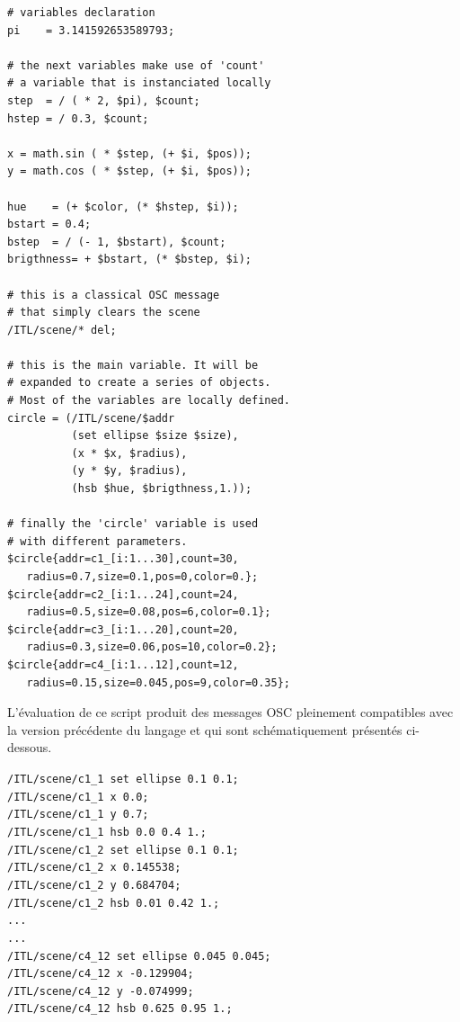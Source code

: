 \documentclass{article}
\newcommand{\code}	[2][0.9]		{\vspace{0mm}\begin{center}\colorbox{mygrey}{
							\begin{minipage}[t]{#1\columnwidth} 
							{\small \texttt{#2}}
							\end{minipage}}\end{center}}
\begin{document}
\begin{lstlisting}[language=inscore, extendedchars=true, basicstyle=\small\ttfamily]
# variables declaration 
pi    = 3.141592653589793;

# the next variables make use of 'count'
# a variable that is instanciated locally
step  = / ( * 2, $pi), $count;
hstep = / 0.3, $count;

x = math.sin ( * $step, (+ $i, $pos));
y = math.cos ( * $step, (+ $i, $pos));

hue    = (+ $color, (* $hstep, $i));
bstart = 0.4;
bstep  = / (- 1, $bstart), $count;
brigthness= + $bstart, (* $bstep, $i);

# this is a classical OSC message
# that simply clears the scene
/ITL/scene/* del;

# this is the main variable. It will be
# expanded to create a series of objects.
# Most of the variables are locally defined.  
circle = (/ITL/scene/$addr  
          (set ellipse $size $size),
          (x * $x, $radius),
          (y * $y, $radius),
          (hsb $hue, $brigthness,1.));

# finally the 'circle' variable is used
# with different parameters. 
$circle{addr=c1_[i:1...30],count=30, 
   radius=0.7,size=0.1,pos=0,color=0.};
$circle{addr=c2_[i:1...24],count=24,
   radius=0.5,size=0.08,pos=6,color=0.1};
$circle{addr=c3_[i:1...20],count=20,
   radius=0.3,size=0.06,pos=10,color=0.2};
$circle{addr=c4_[i:1...12],count=12,
   radius=0.15,size=0.045,pos=9,color=0.35};

\end{lstlisting}



L'évaluation de ce script produit des messages OSC pleinement compatibles avec la version précédente du langage et qui sont schématiquement présentés ci-dessous. 
\code[1]{/ITL/scene/c1\_1 set ellipse 0.1 0.1;\\
/ITL/scene/c1\_1 x 0.0;\\
/ITL/scene/c1\_1 y 0.7;\\
/ITL/scene/c1\_1 hsb 0.0 0.4 1.;\\
/ITL/scene/c1\_2 set ellipse 0.1 0.1;\\
/ITL/scene/c1\_2 x 0.145538;\\
/ITL/scene/c1\_2 y 0.684704;\\
/ITL/scene/c1\_2 hsb 0.01 0.42 1.;\\
...\\
...\\
/ITL/scene/c4\_12 set ellipse 0.045 0.045;\\
/ITL/scene/c4\_12 x -0.129904;\\
/ITL/scene/c4\_12 y -0.074999;\\
/ITL/scene/c4\_12 hsb 0.625 0.95 1.;
}
\end{document}
